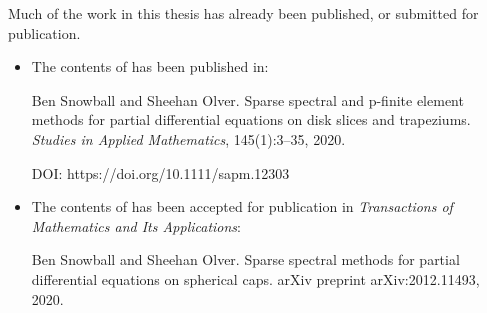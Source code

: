 

\begin{foreword}

Much of the work in this thesis has already been published, or submitted for publication.

\begin{itemize}

\item The contents of  has been published in:

Ben Snowball and Sheehan Olver. Sparse spectral and p-finite element methods for partial differential equations on disk slices and trapeziums. \textit{Studies in Applied Mathematics}, 145(1):3--35, 2020. 

DOI: https://doi.org/10.1111/sapm.12303

\item The contents of  has been accepted for publication in \textit{Transactions of Mathematics and Its Applications}:

Ben Snowball and Sheehan Olver. Sparse spectral methods for partial differential equations on spherical caps. arXiv preprint arXiv:2012.11493, 2020.

\end{itemize}

\end{foreword}
